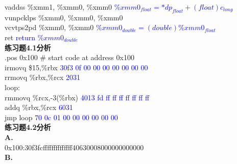\documentclass{article}
\newcommand{\blue}[1]{\textcolor{blue}{#1}}
\begin{document}
\begin{CJK}{UTF8}{gbsn}
	\hspace*{1em}vaddss	\%xmm1, \%xmm0, \%xmm0 \blue{$\%xmm0_{float}=*dp_{float}+(float)c_{long}$}	\\
	\hspace*{1em}vunpcklps	\%xmm0, \%xmm0, \%xmm0 \blue{}	\\
	\hspace*{1em}vcvtps2pd	\%xmm0, \%xmm0 \blue{$\%xmm0_{double}=(double)\%xmm0_{float}$}	\\
	\hspace*{1em}ret \blue{return $\%xmm0_{double}$}	\\[3ex]
\newpage
\noindent\textbf{练习题4.1分析}	\\
.pos 0x100 \# start code at address 0x100	\\
	\hspace*{1em}irmovq \$15,\%rbx	\blue{30f3 0f 00 00 00 00 00 00 00}\\
	\hspace*{1em}rrmovq \%rbx,\%rcx	\blue{2031}\\
loop:	\\
	\hspace*{1em}rmmovq \%rcx,-3(\%rbx)	\blue{4013 fd ff ff ff ff ff ff ff}\\
	\hspace*{1em}addq \%rbx,\%rcx	\blue{6031}\\
	\hspace*{1em}jmp loop	\blue{70 0c 01 00 00 00 00 00 00}\\[3ex]
\textbf{练习题4.2分析}	\\
\textbf{A.}	\\
0x100:30f3fcffffffffffffff40630008000000000000	\\
\textbf{B.}	\\



\end{CJK}
\end{document}
